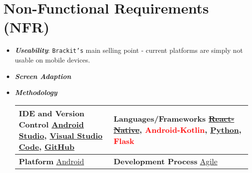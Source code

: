 \documentclass{article}
\newcommand{\cmark}{\ding{51}}%
\newcommand{\done}{\rlap{$\square$}{\raisebox{2pt}{\large\hspace{1pt}\textcolor{green}{\cmark}}}%
\hspace{-2.5pt}}
\newcommand{\partly}{\rlap{$\square$}{\large\hspace{1pt}\textcolor{green}{\ding{51}}
\textsuperscript{\textcolor{red}{\kern-0.5em\tiny\ding{55}}}}}
\begin{document}
\section*{Non-Functional Requirements (NFR)}
\begin{itemize}
\item \textbf{\textit{Useability}}: \texttt{Brackit's} main selling point - current platforms are simply not usable on mobile devices. 

\item \textbf{\textit{Screen Adaption}}


\item \textbf{\textit{Methodology}}
\begin{center}
    \begin{tabular}{ |p{75mm}|p{75mm}| }
        \hline
        \textbf{IDE and Version Control}  \newline
        {\href{https://developer.android.com/studio}{Android Studio}},
        {\href{https://code.visualstudio.com/}{Visual Studio Code}},
        {\href{https://github.com/}{GitHub}}   & 
        \textbf{Languages/Frameworks} \newline 
        {\href{https://facebook.github.io/react-native/}{\sout{React-Native}}},
        \textcolor{red}{Android-Kotlin},
        {\href{https://www.python.org/}{Python}}, 
        \textcolor{red}{Flask}\\
        \hline
        \textbf{Platform} \newline
        {\href{https://www.android.com/}{Android}} & 
        \textbf{Development Process} \newline
        {\href{https://agilemanifesto.org/}{Agile}} \\
        \hline
    \end{tabular}
\end{center}
\end{itemize}
\end{document}
